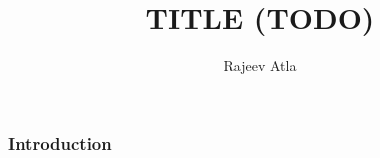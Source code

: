 \documentclass{beamer}
\author{Rajeev Atla}
\title{TITLE (TODO)}
\begin{document}
\frame{\titlepage}



\begin{frame}
\frametitle{Introduction}



\end{frame}
\end{document}
